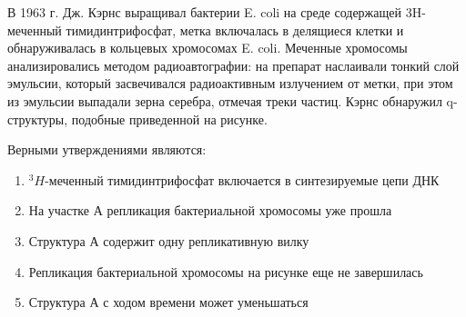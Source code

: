 
В 1963 г. Дж. Кэрнс выращивал бактерии E. coli на среде содержащей 3H-меченный
тимидинтрифосфат, метка включалась в делящиеся клетки и обнаруживалась в
кольцевых хромосомах E. coli.
Меченные хромосомы анализировались методом радиоавтографии: на препарат
наслаивали тонкий слой эмульсии, который засвечивался радиоактивным излучением
от метки, при этом из эмульсии выпадали зерна серебра, отмечая треки частиц.
Кэрнс обнаружил q-структуры, подобные приведенной на рисунке.


Верными утверждениями являются:

\begin{enumerate}
    \item ${}^{3}H$-меченный тимидинтрифосфат включается в синтезируемые цепи ДНК
    \item На участке А репликация бактериальной хромосомы уже прошла
    \item Структура А содержит одну репликативную вилку
    \item Репликация бактериальной хромосомы на рисунке еще не завершилась
    \item Структура А с ходом времени может уменьшаться
\end{enumerate}




